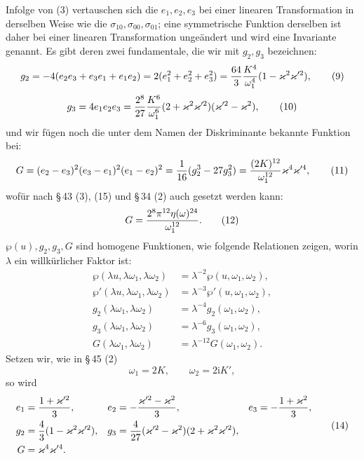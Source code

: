 \documentclass[11pt]{article}
\providecommand{\ii}{\mathrm{i}}
\begin{document}
Infolge von (3) vertauschen sich die $e_1,e_2,e_3$ bei einer linearen Transformation in derselben Weise wie die $\sigma_{10},\sigma_{00},\sigma_{01}$; eine symmetrische Funktion derselben ist daher bei einer linearen Transformation ungeändert und wird eine Invariante genannt. Es gibt deren zwei fundamentale, die wir mit $g_2,g_3$ bezeichnen:
\begin{equation}
g_2=-4(e_2e_3+e_3e_1+e_1e_2)=2(e_1^2+e_2^2+e_3^2)
={64\over3}{K^4\over\omega_1^4}(1-\varkappa^2\varkappa'^2),
\tag{9}
\end{equation}
\begin{equation}
g_3=4e_1e_2e_3={2^8\over27}{K^6\over\omega_1^6}(2+\varkappa^2\varkappa'^2)(\varkappa'^2-\varkappa^2),
\tag{10}
\end{equation}
und wir fügen noch die unter dem Namen der Diskriminante bekannte Funktion bei:
\begin{equation}
G=(e_2-e_3)^2(e_3-e_1)^2(e_1-e_2)^2={1\over16}(g_2^3-27g_3^2)
={(2K)^{12}\over\omega_1^{12}}\varkappa^4\varkappa'^4,
\tag{11}
\end{equation}
wofür nach \S\,43 (3), (15) und \S\,34 (2) auch gesetzt werden kann:
\begin{equation}
G={2^8\pi^{12}\eta(\omega)^{24}\over\omega_1^{12}}.
\tag{12}
\end{equation}
$\wp(u),g_2,g_3,G$ sind homogene Funktionen, wie folgende Relationen zeigen, worin $\lambda$ ein willkürlicher Faktor ist:
\begin{equation}
\begin{aligned}
\wp(\lambda u,\lambda\omega_1,\lambda\omega_2)&=\lambda^{-2}\wp(u,\omega_1,\omega_2),\\
\wp'(\lambda u,\lambda\omega_1,\lambda\omega_2)&=\lambda^{-3}\wp'(u,\omega_1,\omega_2),\\
g_2(\lambda\omega_1,\lambda\omega_2)&=\lambda^{-4}g_2(\omega_1,\omega_2),\\
g_3(\lambda\omega_1,\lambda\omega_2)&=\lambda^{-6}g_3(\omega_1,\omega_2),\\
G(\lambda\omega_1,\lambda\omega_2)&=\lambda^{-12}G(\omega_1,\omega_2).
\end{aligned}
\tag{13}
\end{equation}
Setzen wir, wie in \S\,45 (2)
\[
\omega_1=2K,
\qquad
\omega_2=2\ii K',
\]
so wird
\begin{equation}
\begin{aligned}
e_1&={1+\varkappa'^2\over3},&
 e_2&=-{\varkappa'^2-\varkappa^2\over3},&
 e_3&=-{1+\varkappa^2\over3},\\
g_2&={4\over3}(1-\varkappa^2\varkappa'^2),&
 g_3&={4\over27}(\varkappa'^2-\varkappa^2)(2+\varkappa^2\varkappa'^2),\\
G&=\varkappa^4\varkappa'^4.
\end{aligned}
\tag{14}
\end{equation}
\end{document}
